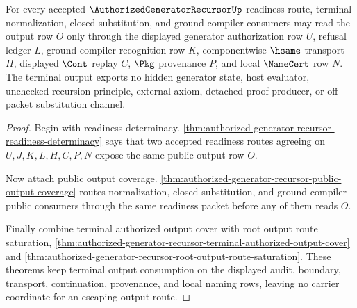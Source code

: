 \begin{theorem}
\label{thm:authorized-generator-recursor-terminal-output-nonescape}
For every accepted $\AuthorizedGeneratorRecursorUp$ readiness route, terminal normalization, closed-substitution, and ground-compiler consumers may read the output row $O$ only through the displayed generator authorization row $U$, refusal ledger $L$, ground-compiler recognition row $K$, componentwise $\hsame$ transport $H$, displayed $\Cont$ replay $C$, $\Pkg$ provenance $P$, and local $\NameCert$ row $N$. The terminal output exports no hidden generator state, host evaluator, unchecked recursion principle, external axiom, detached proof producer, or off-packet substitution channel.
\end{theorem}
\begin{proof}
Begin with readiness determinacy. \autoref{thm:authorized-generator-recursor-readiness-determinacy} says that two accepted readiness routes agreeing on $U,J,K,L,H,C,P,N$ expose the same public output row $O$.

Now attach public output coverage. \autoref{thm:authorized-generator-recursor-public-output-coverage} routes normalization, closed-substitution, and ground-compiler public consumers through the same readiness packet before any of them reads $O$.

Finally combine terminal authorized output cover with root output route saturation, \autoref{thm:authorized-generator-recursor-terminal-authorized-output-cover} and \autoref{thm:authorized-generator-recursor-root-output-route-saturation}. These theorems keep terminal output consumption on the displayed audit, boundary, transport, continuation, provenance, and local naming rows, leaving no carrier coordinate for an escaping output route.
\end{proof}

